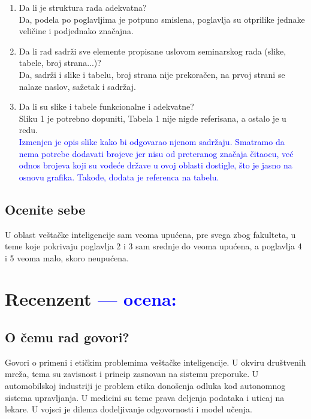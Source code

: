 \documentclass[a4paper]{report}
\newcommand{\odgovor}[1]{\textcolor{blue}{#1}}
\begin{document}
\begin{enumerate}
\item Da li je struktura rada adekvatna?\\
Da, podela po poglavljima je potpuno smislena, poglavlja su otprilike jednake veličine i podjednako značajna.

\item Da li rad sadrži sve elemente propisane uslovom seminarskog rada (slike, tabele, broj strana...)?\\
Da, sadrži i slike i tabelu, broj strana nije prekoračen, na prvoj strani se nalaze naslov, sažetak i sadržaj. 

\item Da li su slike i tabele funkcionalne i adekvatne?\\
Sliku 1 je potrebno dopuniti, Tabela 1 nije nigde referisana, a ostalo je u redu. \\
\odgovor{Izmenjen je opis slike kako bi odgovarao njenom sadržaju. Smatramo da nema potrebe dodavati brojeve jer nisu od preteranog značaja čitaocu, već odnos brojeva koji su vodeće države u ovoj oblasti dostigle, što je jasno na osnovu grafika. Takođe, dodata je referenca na tabelu.}
\end{enumerate}

\section{Ocenite sebe}
U oblast veštačke inteligencije sam veoma upućena, pre svega zbog fakulteta, u teme koje pokrivaju poglavlja 2 i 3 sam srednje do veoma upućena, a poglavlja 4 i 5 veoma malo, skoro neupućena. 


\chapter{Recenzent \odgovor{--- ocena:} }


\section{O čemu rad govori?}

Govori o primeni i etičkim problemima veštačke inteligencije. U okviru društvenih mreža, tema su zavisnost i princip zasnovan na sistemu preporuke. U automobilskoj industriji je problem etika donošenja odluka kod autonomnog sistema upravljanja. U medicini su teme prava deljenja podataka i uticaj na lekare. U vojsci je dilema dodeljivanje odgovornosti i model učenja.
\end{document}
